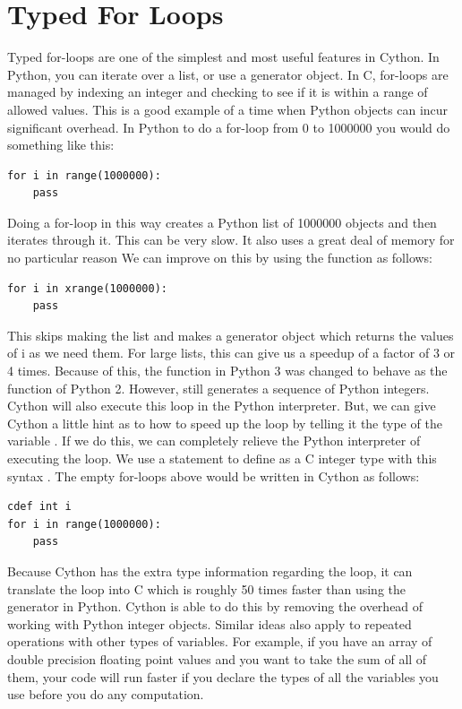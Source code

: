 \section*{Typed For Loops}
Typed for-loops are one of the simplest and most useful features in Cython.
In Python, you can iterate over a list, or use a generator object.
In C, for-loops are managed by indexing an integer and checking to see if it is within a range of allowed values.
This is a good example of a time when Python objects can incur significant overhead.
In Python to do a for-loop from 0 to 1000000 you would do something like this:
\begin{lstlisting}
for i in range(1000000):
    pass
\end{lstlisting}
Doing a for-loop in this way creates a Python list of 1000000 objects and then iterates through it.
This can  be very slow.
It also uses a great deal of memory for no particular reason
We can improve on this by using the  function as follows:
\begin{lstlisting}
for i in xrange(1000000):
    pass
\end{lstlisting}
This skips making the list and makes a generator object which returns the values of i as we need them.
For large lists, this can give us a speedup of a factor of 3 or 4 times.
Because of this, the  function in Python 3 was changed to behave as the  function of Python 2.
However,  still generates a sequence of Python integers.
Cython will also execute this loop in the Python interpreter.
But, we can give Cython a little hint as to how to speed up the loop by telling it the type of the variable .
If we do this, we can completely relieve the Python interpreter of executing the loop.
We use a  statement to define  as a C integer type with this syntax .
The empty for-loops above would be written in Cython as follows:
\begin{lstlisting}
cdef int i
for i in range(1000000):
    pass
\end{lstlisting}
Because Cython has the extra type information regarding the loop, it can translate the loop into C which is roughly 50 times faster than using the generator in Python.
Cython is able to do this by removing the overhead of working with Python integer objects.
Similar ideas also apply to repeated operations with other types of variables.
For example, if you have an array of double precision floating point values and you want to take the sum of all of them, your code will run faster if you declare the types of all the variables you use before you do any computation.
